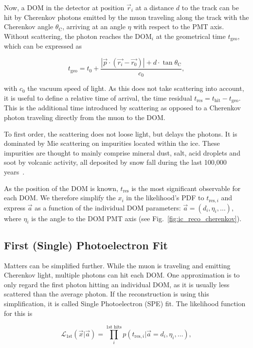Now, a DOM in the detector at position $\vec{r}_i$ at a distance $d$ to the track can be hit by Cherenkov photons emitted by the muon traveling along the track with the Cherenkov angle $\theta_\text{C}$, arriving at an angle $\eta$ with respect to the PMT axis. Without scattering, the photon reaches the $\text{DOM}_i$ at the geometrical time $t_\text{geo}$, which can be expressed as

\begin{equation}
    t_\text{geo} = t_0 + \frac{|\vec{p}\cdot(\vec{r_i}-\vec{r_0})|+d\cdot \tan{\theta_\text{C}}}{c_0},
\end{equation}

with $c_0$ the vacuum speed of light. As this does not take scattering into account, it is useful to define a relative time of arrival, the time residual $t_\text{res} = t_\text{hit} - t_\text{geo}$. This is the additional time introduced by scattering as opposed to a Cherenkov photon traveling directly from the muon to the DOM\@.

To first order, the scattering does not loose light, but delays the photons. It is dominated by Mie scattering on impurities located within the ice. These impurities are thought to mainly comprise mineral dust, salt, acid droplets and soot by volcanic activity, all deposited by snow fall during the last 100,000 years~.

As the position of the DOM is known, $t_\text{res}$ is the most significant observable for each DOM. We therefore simplify the $x_i$ in the likelihood's PDF to $t_{\text{res},i}$ and express $\vec{a}$ as a function of the individual DOM parameters: $\vec{a}= (d_i,\eta_i,\ldots)$, where $\eta_i$ is the angle to the DOM PMT axis (see Fig.~\ref{fig:ic_reco_cherenkov}).


\subsection{First (Single) Photoelectron Fit}
Matters can be simplified further. While the muon is traveling and emitting Cherenkov light, multiple photons can hit each DOM\@. One approximation is to only regard the first photon hitting an individual DOM, as it is usually less scattered than the average photon. If the reconstruction is using this simplification, it is called Single Photoelectron (SPE) fit. The likelihood function for this is

\begin{equation}
    \mathcal{L}_\text{1st}(\vec{x}|\vec{a}) = \prod_i^\text{1st hits} p(t_{\text{res},i}|\vec{a}=d_i, \eta_i,\ldots),
\end{equation}

